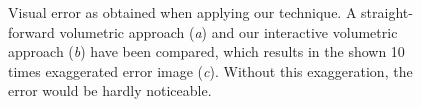 \documentclass[review,journal]{vgtc}         %
\begin{document}
\begin{figure}
    \centering
    \caption{Visual error as obtained when applying our technique. A straight-forward volumetric approach ({\it a}) and our interactive volumetric approach ({\it b}) have been compared, which results in the shown 10 times exaggerated error image ({\it c}). Without this exaggeration, the error would be hardly noticeable.}
    \label{fig:heart-analysis}
\end{figure}
\end{document}
